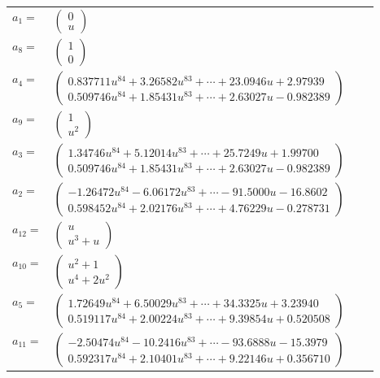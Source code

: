 \documentclass[1p]{elsarticle_modified}
\theoremstyle{definition}
\begin{document}
\begin{tabular}{m{7pt} m{180pt} m{7pt} m{180pt} }
\flushright $a_{1}=$&$\begin{pmatrix}0\\u\end{pmatrix}$ \\
\flushright $a_{8}=$&$\begin{pmatrix}1\\0\end{pmatrix}$ \\
\flushright $a_{4}=$&$\begin{pmatrix}0.837711 u^{84}+3.26582 u^{83}+\cdots+23.0946 u+2.97939\\0.509746 u^{84}+1.85431 u^{83}+\cdots+2.63027 u-0.982389\end{pmatrix}$ \\
\flushright $a_{9}=$&$\begin{pmatrix}1\\u^2\end{pmatrix}$ \\
\flushright $a_{3}=$&$\begin{pmatrix}1.34746 u^{84}+5.12014 u^{83}+\cdots+25.7249 u+1.99700\\0.509746 u^{84}+1.85431 u^{83}+\cdots+2.63027 u-0.982389\end{pmatrix}$ \\
\flushright $a_{2}=$&$\begin{pmatrix}-1.26472 u^{84}-6.06172 u^{83}+\cdots-91.5000 u-16.8602\\0.598452 u^{84}+2.02176 u^{83}+\cdots+4.76229 u-0.278731\end{pmatrix}$ \\
\flushright $a_{12}=$&$\begin{pmatrix}u\\u^3+u\end{pmatrix}$ \\
\flushright $a_{10}=$&$\begin{pmatrix}u^2+1\\u^4+2 u^2\end{pmatrix}$ \\
\flushright $a_{5}=$&$\begin{pmatrix}1.72649 u^{84}+6.50029 u^{83}+\cdots+34.3325 u+3.23940\\0.519117 u^{84}+2.00224 u^{83}+\cdots+9.39854 u+0.520508\end{pmatrix}$ \\
\flushright $a_{11}=$&$\begin{pmatrix}-2.50474 u^{84}-10.2416 u^{83}+\cdots-93.6888 u-15.3979\\0.592317 u^{84}+2.10401 u^{83}+\cdots+9.22146 u+0.356710\end{pmatrix}$ \\

\end{tabular}
\end{document}
